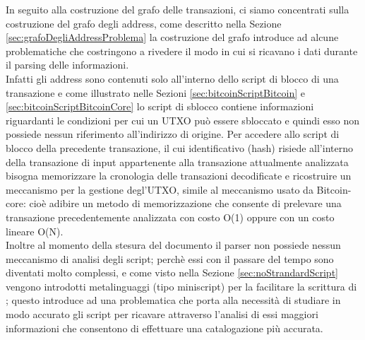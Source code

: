 In seguito alla costruzione del grafo delle transazioni, ci siamo concentrati sulla costruzione del grafo degli address, come descritto nella Sezione \ref{sec:grafoDegliAddressProblema} la costruzione del grafo introduce ad alcune problematiche che costringono a rivedere il modo in cui si ricavano i dati durante il parsing delle informazioni.\\
Infatti gli address sono contenuti solo all'interno dello script di blocco di una transazione e come illustrato nelle Sezioni \ref{sec:bitcoinScriptBitcoin} e \ref{sec:bitcoinScriptBitcoinCore} lo script di sblocco contiene informazioni riguardanti le condizioni per cui un UTXO può essere sbloccato e quindi esso non possiede nessun riferimento all'indirizzo di origine.
Per accedere allo script di blocco della precedente transazione, il cui identificativo (hash) risiede all'interno della transazione di input appartenente alla transazione attualmente analizzata bisogna memorizzare la cronologia delle transazioni decodificate e ricostruire un meccanismo per la gestione degl'UTXO, simile al meccanismo usato da Bitcoin-core: cioè adibire un metodo di memorizzazione che consente di prelevare una transazione precedentemente analizzata con costo O(1) oppure con un costo lineare O(N).\\
Inoltre al momento della stesura del documento il parser non possiede nessun meccanismo di analisi degli script; perchè essi con il passare del tempo sono diventati molto complessi, e come visto nella Sezione \ref{sec:noStrandardScript} vengono introdotti metalinguaggi (tipo miniscript) per la facilitare la scrittura di ; questo introduce ad una problematica che porta alla necessità di studiare in modo accurato gli script per ricavare attraverso l'analisi di essi maggiori informazioni che consentono di effettuare una catalogazione più accurata.
